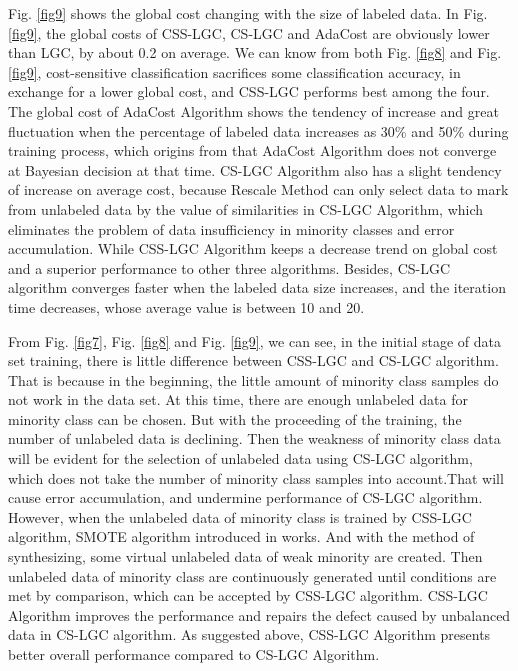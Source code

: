 \documentclass{svjour3}                     %
\begin{document}
Fig. \ref{fig9} shows the global cost changing with the size of labeled data. In Fig. \ref{fig9}, the global costs of CSS-LGC, CS-LGC and AdaCost are obviously lower than LGC, by about 0.2 on average. We can know from both Fig. \ref{fig8} and Fig. \ref{fig9}, cost-sensitive classification sacrifices some classification accuracy, in exchange for a lower global cost, and CSS-LGC performs best among the four.
The global cost of AdaCost Algorithm shows the tendency of increase and great fluctuation when the percentage of labeled data increases as 30\% and 50\% during training process, which origins from that AdaCost Algorithm does not converge at Bayesian decision at that time. CS-LGC Algorithm also has a slight tendency of increase on average cost, because Rescale Method can only select data to mark from unlabeled data by the value of similarities in CS-LGC Algorithm, which eliminates the problem of data insufficiency in minority classes and error accumulation. While CSS-LGC Algorithm keeps a decrease trend on global cost and a superior performance to other three algorithms. Besides, CS-LGC algorithm converges faster when the labeled data size increases, and the iteration time decreases, whose average value is between 10 and 20. 

 From Fig. \ref{fig7}, Fig. \ref{fig8} and Fig. \ref{fig9}, we can see, in the initial stage of data set training, there is little difference between CSS-LGC and CS-LGC algorithm. That is because in the beginning, the little amount of minority class samples do not work in the data set. At this time, there are enough unlabeled data for minority class can be chosen. But with the proceeding of the training, the number of unlabeled data is declining. Then the weakness of minority class data will be evident for the selection of unlabeled data using CS-LGC algorithm, which does not take the number of minority class samples into account.That will cause error accumulation, and undermine performance of CS-LGC algorithm. However, when the unlabeled data of minority class is trained by CSS-LGC algorithm, SMOTE algorithm introduced in works. And with the method of synthesizing, some virtual unlabeled data of weak minority are created. Then unlabeled data of minority class are continuously generated until conditions are met by comparison, which can be accepted by CSS-LGC algorithm. CSS-LGC Algorithm improves the performance and repairs the defect caused by unbalanced data in CS-LGC algorithm. As suggested above, CSS-LGC Algorithm presents better overall performance compared to CS-LGC Algorithm.
\end{document}
